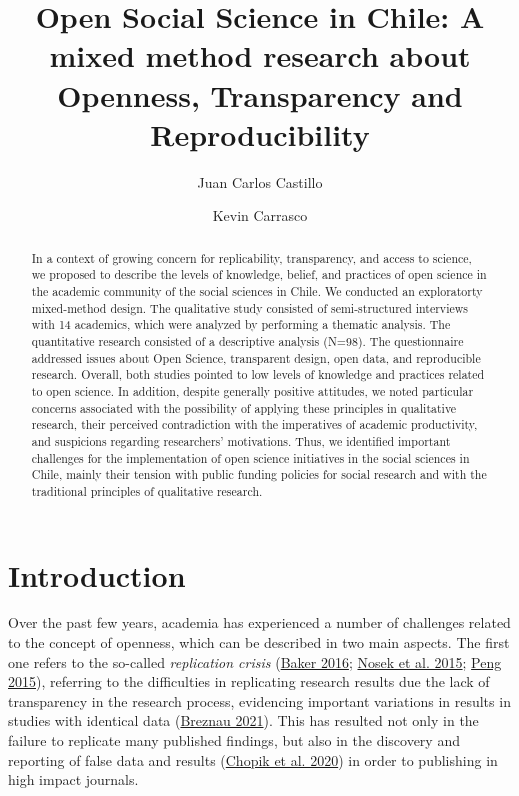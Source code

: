 \documentclass[
  letterpaper,
  DIV=11,
  numbers=noendperiod]{scrartcl}
\title{Open Social Science in Chile: A mixed method research about
Openness, Transparency and Reproducibility}
\author{Juan Carlos Castillo \and Kevin Carrasco}
\date{}
\begin{document}
\maketitle
\begin{abstract}
In a context of growing concern for replicability, transparency, and
access to science, we proposed to describe the levels of knowledge,
belief, and practices of open science in the academic community of the
social sciences in Chile. We conducted an exploratorty mixed-method
design. The qualitative study consisted of semi-structured interviews
with 14 academics, which were analyzed by performing a thematic
analysis. The quantitative research consisted of a descriptive analysis
(N=98). The questionnaire addressed issues about Open Science,
transparent design, open data, and reproducible research. Overall, both
studies pointed to low levels of knowledge and practices related to open
science. In addition, despite generally positive attitudes, we noted
particular concerns associated with the possibility of applying these
principles in qualitative research, their perceived contradiction with
the imperatives of academic productivity, and suspicions regarding
researchers' motivations. Thus, we identified important challenges for
the implementation of open science initiatives in the social sciences in
Chile, mainly their tension with public funding policies for social
research and with the traditional principles of qualitative research.
\end{abstract}
\ifdefined\Shaded\renewenvironment{Shaded}{\begin{tcolorbox}[borderline west={3pt}{0pt}{shadecolor}, boxrule=0pt, sharp corners, interior hidden, breakable, enhanced, frame hidden]}{\end{tcolorbox}}\fi

\hypertarget{introduction}{%
\section{Introduction}\label{introduction}}

Over the past few years, academia has experienced a number of challenges
related to the concept of openness, which can be described in two main
aspects. The first one refers to the so-called \emph{replication crisis}
(\protect\hyperlink{ref-baker_1500_2016}{Baker 2016};
\protect\hyperlink{ref-nosek_promoting_2015}{Nosek et al. 2015};
\protect\hyperlink{ref-peng_reproducibility_2015}{Peng 2015}), referring
to the difficulties in replicating research results due the lack of
transparency in the research process, evidencing important variations in
results in studies with identical data
(\protect\hyperlink{ref-breznau_does_2021}{Breznau 2021}). This has
resulted not only in the failure to replicate many published findings,
but also in the discovery and reporting of false data and results
(\protect\hyperlink{ref-chopik_relationship_2020}{Chopik et al. 2020})
in order to publishing in high impact journals.
\end{document}
